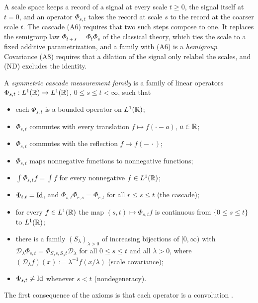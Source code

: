 A scale space keeps a record of a signal at every scale $t \ge 0$, the signal itself at $t = 0$,
and an operator $\Phi_{s,t}$ takes the record at scale $s$ to the record at the coarser scale $t$.
The cascade (A6) requires that two such steps compose to one. It replaces the semigroup law
$\Phi_{t+s} = \Phi_t\Phi_s$ of the classical theory, which ties the scale to a fixed additive
parametrization, and a family with (A6) is a \emph{hemigroup}. Covariance (A8) requires that a dilation
of the signal only relabel the scales, and (ND) excludes the identity.

\begin{definition}
\label{def:cascade-measurement-family}

A \emph{symmetric cascade measurement family} is a family of linear operators
$\Phi_{s,t} : L^1(\mathbb{R}) \to L^1(\mathbb{R})$, $0 \le s \le t < \infty$, such that
\begin{itemize}
\item[(A1)] each $\Phi_{s,t}$ is a bounded operator on $L^1(\mathbb{R})$;
\item[(A2)] $\Phi_{s,t}$ commutes with every translation $f \mapsto f(\cdot - a)$, $a \in \mathbb{R}$;
\item[(A3)] $\Phi_{s,t}$ commutes with the reflection $f \mapsto f(-\,\cdot)$;
\item[(A4)] $\Phi_{s,t}$ maps nonnegative functions to nonnegative functions;
\item[(A5)] $\int\Phi_{s,t}f = \int f$ for every nonnegative $f \in L^1(\mathbb{R})$;
\item[(A6)] $\Phi_{t,t} = \mathrm{Id}$, and $\Phi_{s,t}\Phi_{r,s} = \Phi_{r,t}$ for all $r \le s \le t$
(the cascade);
\item[(A7)] for every $f \in L^1(\mathbb{R})$ the map $(s,t) \mapsto \Phi_{s,t}f$ is continuous from
$\{0 \le s \le t\}$ to $L^1(\mathbb{R})$;
\item[(A8)] there is a family $(S_\lambda)_{\lambda > 0}$ of increasing bijections of $[0,\infty)$
with $\mathcal{D}_\lambda\Phi_{s,t} = \Phi_{S_\lambda s, S_\lambda t}\mathcal{D}_\lambda$ for all
$0 \le s \le t$ and all $\lambda > 0$, where $(\mathcal{D}_\lambda f)(x) := \lambda^{-1}f(x/\lambda)$
(scale covariance);
\item[(ND)] $\Phi_{s,t} \ne \mathrm{Id}$ whenever $s < t$ (nondegeneracy).
\end{itemize}
\end{definition}

The first consequence of the axioms is that each operator is a convolution
.

